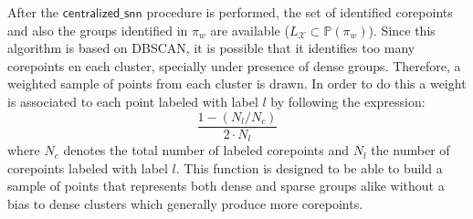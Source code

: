 \documentclass[preprint,12pt,authoryear,review]{elsarticle}
\begin{document}
After the $\mathsf{centralized\_snn}$ procedure is performed, the set of identified corepoints and also the groups identified in $\pi_w$ are available ($L_\mathcal{X}\subset \mathbb{P}(\pi_w)$). Since this algorithm is based on DBSCAN, it is possible that it identifies too many corepoints en each cluster, specially under presence of dense groups. Therefore, a weighted sample of points from each cluster is drawn. 
In order to do this a weight is associated to each point labeled with label $l$ by following the expression:\[\dfrac{1 - ( N_l/N_c ) }{2\cdot N_l}\] where $N_c$ denotes the total number of labeled corepoints and $N_l$ the number of corepoints labeled with label $l$. 
This function is designed to be able to build a sample of points that represents both dense and sparse groups alike without a bias to dense clusters which generally produce more corepoints.

\end{document}
